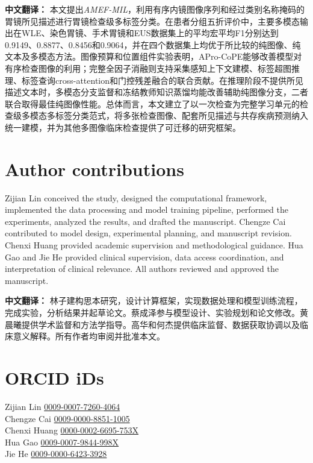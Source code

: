 \documentclass[Afour,sagev,times]{sagej}
\begin{document}
\textbf{中文翻译：} 本文提出\textit{AMEF-MIL}，利用有序内镜图像序列和经过类别名称掩码的胃镜所见描述进行胃镜检查级多标签分类。在患者分组五折评价中，主要多模态输出在WLE、染色胃镜、手术胃镜和EUS数据集上的平均宏平均F1分别达到0.9149、0.8877、0.8456和0.9064，并在四个数据集上均优于所比较的纯图像、纯文本及多模态方法。图像预算和位置组件实验表明，APro-CoPE能够改善模型对有序检查图像的利用；完整全因子消融则支持采集感知上下文建模、标签超图推理、标签查询cross-attention和门控残差融合的联合贡献。在推理阶段不提供所见描述文本时，多模态分支监督和冻结教师知识蒸馏均能改善辅助纯图像分支，二者联合取得最佳纯图像性能。总体而言，本文建立了以一次检查为完整学习单元的检查级多模态多标签分类范式，将多张检查图像、配套所见描述与共存疾病预测纳入统一建模，并为其他多图像临床检查提供了可迁移的研究框架。

\section*{Author contributions}

Zijian Lin conceived the study, designed the computational framework, implemented the data processing and model training pipeline, performed the experiments, analyzed the results, and drafted the manuscript. Chengze Cai contributed to model design, experimental planning, and manuscript revision. Chenxi Huang provided academic supervision and methodological guidance. Hua Gao and Jie He provided clinical supervision, data access coordination, and interpretation of clinical relevance. All authors reviewed and approved the manuscript.

\textbf{中文翻译：} 林子建构思本研究，设计计算框架，实现数据处理和模型训练流程，完成实验，分析结果并起草论文。蔡成泽参与模型设计、实验规划和论文修改。黄晨曦提供学术监督和方法学指导。高华和何杰提供临床监督、数据获取协调以及临床意义解释。所有作者均审阅并批准本文。

\section*{ORCID iDs}
Zijian Lin \href{https://orcid.org/0009-0007-7260-4064}{0009-0007-7260-4064}\\
Chengze Cai \href{https://orcid.org/0009-0000-8851-1005}{0009-0000-8851-1005}\\
Chenxi Huang \href{https://orcid.org/0000-0002-6695-753X}{0000-0002-6695-753X}\\
Hua Gao \href{https://orcid.org/0009-0007-9844-998X}{0009-0007-9844-998X}\\
Jie He \href{https://orcid.org/0009-0000-6423-3928}{0009-0000-6423-3928}
\end{document}
